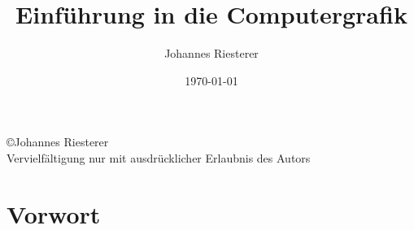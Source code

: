 \title{Einführung in die Computergrafik}
\author{Johannes Riesterer}
\date{\today}
\maketitle
\newpage 
\begin{center}
\large
 \copyright Johannes Riesterer \\
Vervielfältigung nur mit ausdrücklicher Erlaubnis des Autors
\end{center}

\newpage

\section*{Vorwort}

\newpage
